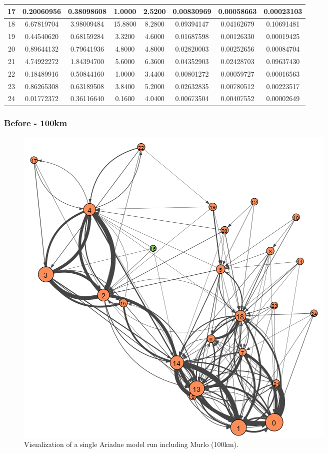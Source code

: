 \documentclass[12pt,a4paper]{thesis}
\begin{document}
\begin{table}[H]
\begin{tabular}{|c|c|c|c|c|c|c|c|}
\hline	17	&	0.20060956	&	0.38098608	&	1.0000	&	2.5200	&	0.00830969	&	0.00058663	&	0.00023103	\\
\hline	18	&	6.67819704	&	3.98009484	&	15.8800	&	8.2800	&	0.09394147	&	0.04162679	&	0.10691481	\\
\hline	19	&	0.44540620	&	0.68159284	&	3.3200	&	4.6000	&	0.01687598	&	0.00126330	&	0.00019425	\\
\hline	20	&	0.89644132	&	0.79641936	&	4.8000	&	4.8000	&	0.02820003	&	0.00252656	&	0.00084704	\\
\hline	21	&	4.74922272	&	1.84394700	&	5.6000	&	6.3600	&	0.04352903	&	0.02428703	&	0.09637430	\\
\hline	22	&	0.18489916	&	0.50844160	&	1.0000	&	3.4400	&	0.00801272	&	0.00059727	&	0.00016563	\\
\hline	23	&	0.86265308	&	0.63189508	&	3.8400	&	5.2000	&	0.02632835	&	0.00780512	&	0.00223517	\\
\hline	24	&	0.01772372	&	0.36116640	&	0.1600	&	4.0400	&	0.00673504	&	0.00407552	&	0.00002649	\\
\hline 
\end{tabular} 
\label{tab:ariadneNodeBefore60}
\end{table}



\subsubsection{Before - 100km}

\begin{figure}[H]
\centering
\includegraphics[width=0.9\linewidth]{./BeforeViz/ariadne100}
\caption{Visualization of a single Ariadne model run including Murlo (100km).}
\label{fig:ariadneB100}
\end{figure}
\end{document}
